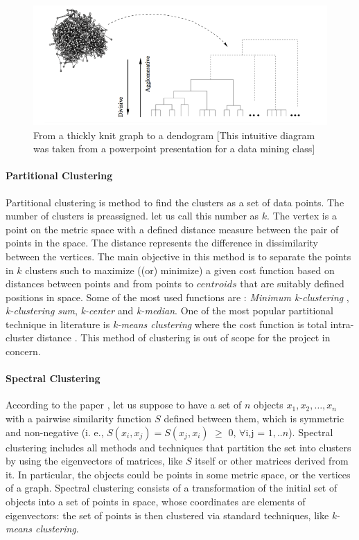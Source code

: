 \begin{figure}[H]
\centering
\includegraphics[scale=0.5]{hirac.png}
\caption{\label{herar}From a thickly knit graph to a dendogram [This intuitive diagram was taken from a powerpoint presentation for a data mining class]}
\end{figure}
\paragraph{Partitional Clustering}
Partitional clustering is method to find the clusters as a set of data points.  The number of clusters is preassigned. let us call this number as $k$. The vertex is a point on the metric space with a defined distance measure between the pair of points in the space.  The distance represents the difference in dissimilarity between the vertices. The main objective in this method is to separate the points in $k$ clusters such to maximize ((or) minimize) a given cost function based on distances between points and from points to $centroids$ that are suitably defined positions in space. 
Some of the most used functions are : \textit{Minimum k-clustering} ,  \textit{k-clustering sum}, \textit{k-center} and \textit{k-median}. One of the most popular partitional technique in literature is \textit{k-means clustering} where the cost function is total intra-cluster distance \cite{communitypaper}. This method of clustering is out of scope for the project in concern.
\paragraph{Spectral Clustering}
According to the paper \cite{communitypaper}, let us suppose to have a set of $n$ objects $x_1 , x_2 , \ldots , x_n$
with a pairwise similarity function $S$ defined between
them, which is symmetric and non-negative (i. e.,
$S(x_i , x_j) = S(x_j , x_i)$ $\geq$ 0, $\forall$i,j = $1, ..n$). Spectral clustering includes all methods and techniques that partition
the set into clusters by using the eigenvectors of matrices,
like $S$ itself or other matrices derived from it. In particular, the objects could be points in some metric space,
or the vertices of a graph. Spectral clustering consists of
a transformation of the initial set of objects into a set of
points in space, whose coordinates are elements of eigenvectors: the set of points is then clustered via standard
techniques, like \textit{k-means clustering}.

